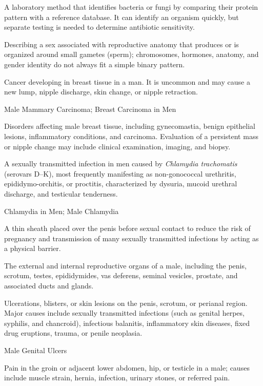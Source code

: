  A laboratory method that identifies bacteria or fungi by comparing their protein pattern with a reference database. It can identify an organism quickly, but separate testing is needed to determine antibiotic sensitivity.

 Describing a sex associated with reproductive anatomy that produces or is organized around small gametes (sperm); chromosomes, hormones, anatomy, and gender identity do not always fit a simple binary pattern.

 Cancer developing in breast tissue in a man. It is uncommon and may cause a new lump, nipple discharge, skin change, or nipple retraction.

\synonyms
Male Mammary Carcinoma; Breast Carcinoma in Men

 Disorders affecting male breast tissue, including gynecomastia, benign epithelial lesions, inflammatory conditions, and carcinoma. Evaluation of a persistent mass or nipple change may include clinical examination, imaging, and biopsy.

 A sexually transmitted infection in men caused by \textit{Chlamydia trachomatis} (serovars D--K), most frequently manifesting as non-gonococcal urethritis, epididymo-orchitis, or proctitis, characterized by dysuria, mucoid urethral discharge, and testicular tenderness.

\synonyms
Chlamydia in Men; Male Chlamydia

 A thin sheath placed over the penis before sexual contact to reduce the risk of pregnancy and transmission of many sexually transmitted infections by acting as a physical barrier.

 The external and internal reproductive organs of a male, including the penis, scrotum, testes, epididymides, vas deferens, seminal vesicles, prostate, and associated ducts and glands.

 Ulcerations, blisters, or skin lesions on the penis, scrotum, or perianal region. Major causes include sexually transmitted infections (such as genital herpes, syphilis, and chancroid), infectious balanitis, inflammatory skin diseases, fixed drug eruptions, trauma, or penile neoplasia.

\synonyms
Male Genital Ulcers

 Pain in the groin or adjacent lower abdomen, hip, or testicle in a male; causes include muscle strain, hernia, infection, urinary stones, or referred pain.


